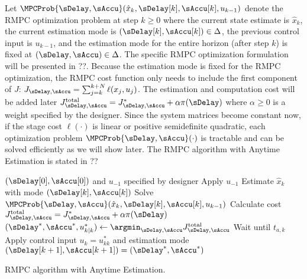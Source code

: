 Let $\MPCProb{\sDelay,\sAccu}(\hat{x}_{k},\sDelay[k],\sAccu[k],u_{k-1})$
denote the RMPC optimization problem at step $k\geq0$ where the current
state estimate is $\hat{x}_{k}$, the current estimation mode is $(\sDelay[k],\sAccu[k])\in\Delta$,
the previous control input is $u_{k-1}$, and the estimation mode
for the entire horizon (after step $k$) is fixed at $(\sDelay,\sAccu)\in\Delta$.
The specific RMPC optimization formulation will be presented in ??.
Because the estimation mode is fixed for the RMPC optimization, the
RMPC cost function only needs to include the first component of $J$:
$J_{\sDelay,\sAccu}=\sum_{j=k}^{k+N}\ell(x_{j},u_{j})$. The estimation
and computation cost will be added later $J_{\sDelay,\sAccu}^{\mathrm{total}}=J_{\sDelay,\sAccu}^{*}+\alpha\pi(\sDelay)$
where $\alpha\geq0$ is a %
weight specified by the designer.
Since the system matrices become constant now, if the stage cost $\ell(\cdot)$
is linear or positive semidefinite quadratic, each optimization problem
$\MPCProb{\sDelay,\sAccu}(\cdot)$ is tractable and can be solved
efficiently as we will show later. 
The RMPC algorithm with Anytime Estimation is stated in ??%

\begin{algorithm}
	\begin{algorithmic}[1]
		\State $\left(\sDelay[0], \sAccu[0]\right)$ and $u_{-1}$ specified by designer
		\State Apply $u_{-1}$
		\State Estimate $\hat{x}_{k}$ with mode $\left(\sDelay[k], \sAccu[k]\right)$
		\State Solve $\MPCProb{\sDelay,\sAccu}(\hat{x}_{k},\sDelay[k],\sAccu[k],u_{k-1})$
		\State Calculate cost $J_{\sDelay,\sAccu}^{\mathrm{total}} = J_{\sDelay,\sAccu}^{*} + \alpha \pi(\sDelay)$
		\EndFor
		\State $( \sDelay^{*}, \sAccu^{*}, u_{k | k}^{*} ) \gets \argmin_{\sDelay,\sAccu} J_{\sDelay,\sAccu}^{\mathrm{total}}$
		\State Wait until $t_{a,k}$
		\State Apply control input $u_{k} = u_{k  k}^{*}$ and estimation mode $\left( \sDelay[k+1], \sAccu[k+1] \right) = \left( \sDelay^{*}, \sAccu^{*} \right)$
		\EndFor
	\end{algorithmic} 
	
	\caption{RMPC algorithm with Anytime Estimation.}
	\label{algo:RMPC-algo}
\end{algorithm}

